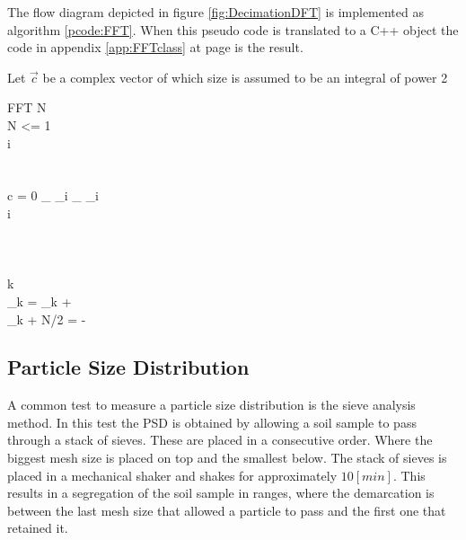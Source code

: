 \documentclass[11pt,fleqn,,a4paper,twoside,openright]{book}
\begin{document}
The flow diagram depicted in figure \ref{fig:DecimationDFT} is implemented as algorithm \ref{pcode:FFT}. When this pseudo code is translated to a C++ object the code in appendix \ref{app:FFTclass} at page \pageref{app:FFTclass} is the result. \\
\begin{sBox}
	Let $ \vec{c} $ be a complex vector of which size is assumed to be an integral of power 2 \\
	\begin{pseudocode}{FFT}{}\label{pcode:FFT}
	N  \\
	\IF N <= 1 \THEN {} \\
	i  \\
	  \\
	  \\
	\FOREACH c \in {} \DO
	\BEGIN
		\IF {} = 0 \THEN {}_{} \GETS {}_i
		\ELSE {}_{} \GETS {}_i \\
		i \\
	\END \\

	 \\
	 \\

	\FOR k  \TO {} \DO
	\BEGIN
		  \\
		_k = _{k} +  \\
		_{k + N/2} =  -  \\
	\END

	\end{pseudocode}
\end{sBox}

\subsection{Particle Size Distribution}\label{Particle Size Distribution}
A common test to measure a particle size distribution is the sieve analysis method. In this test the PSD is obtained by allowing a soil sample to pass through a stack of sieves. These are placed in a consecutive order. Where the biggest mesh size is placed on top and the smallest below. The stack of sieves is placed in a mechanical shaker and shakes for approximately $ 10 [min] $. This results in a segregation of the soil sample in ranges, where the demarcation is between the last mesh size that allowed a particle to pass and the first one that retained it.
\end{document}
